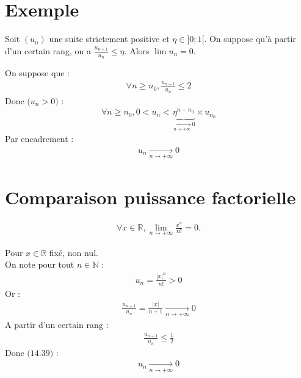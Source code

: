 \documentclass[../main.tex]{subfiles}
\begin{document}
\section{Exemple}
\begin{tcolorbox}[title=Exemple 14.39, title filled=false, colframe=darkgreen, colback=darkgreen!10!white]
    Soit $(u_n)$ une suite strictement positive et $\eta \in ]0; 1[$. On suppose qu'à partir d'un certain rang, on a $\frac{u_{n+1}}{u_n} \leq \eta$. Alors $\lim u_n = 0$. 
\end{tcolorbox}

On suppose que : 
\begin{align*}
    \forall n \geq n_0, \frac{u_{n+1}}{u_n} \leq 2
\end{align*}
Donc $\text{($u_n > 0$)}$ : 
\begin{align*}
    \forall n \geq n_0, 0 < u_n < \underbrace{\eta^{n-n_0}}_{\underset{n \to +\infty}{\longrightarrow} 0} \times u_{n_0}
\end{align*}
Par encadrement : 
\begin{align*}
    \boxed{u_n \underset{n \to +\infty}{\longrightarrow} 0}
\end{align*}

\section{Comparaison puissance factorielle}
\begin{tcolorbox}[title=Théorème 14.40, title filled=false, colframe=orange, colback=orange!10!white]
    \begin{align*}
        \forall x \in \mathbb{R}, \lim_{n \to +\infty} \frac{x^n}{n!} = 0.
    \end{align*}
\end{tcolorbox}

Pour $x \in \mathbb{R}$ fixé, non nul. \\
On note pour tout $n \in \mathbb{N}$ : 
\begin{align*}
    u_n = \frac{|x|^n}{n!} > 0
\end{align*}
Or : 
\begin{align*}
    \frac{u_{n+1}}{u_n} = \frac{|x|}{n+1} \underset{n \to +\infty}{\longrightarrow} 0
\end{align*}
A partir d'un certain rang : 
\begin{align*}
    \frac{u_{n+1}}{u_n} \leq \frac{1}{2}
\end{align*}
Donc $\text{(14.39)}$ : 
\begin{align*}
    \boxed{u_n \underset{n \to +\infty}{\longrightarrow}  0}
\end{align*}
\end{document}
